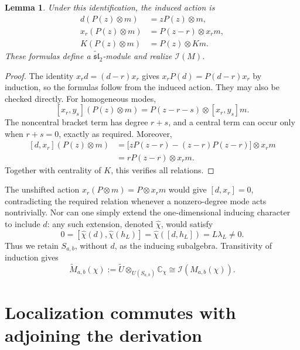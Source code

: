 \documentclass[11pt]{article}
\newcommand{\C}{\mathbb C}
\newcommand{\gt}{\widetilde{\mathfrak{sl}}_2}
\newcommand{\I}{\mathcal I}
\newtheorem{lemma}[theorem]{Lemma}
\theoremstyle{definition}
\begin{document}
\begin{lemma}\label{lem:shift-action}
Under this identification, the induced action is
\begin{equation}\label{eq:shift-action}
\begin{aligned}
 d(P(z)\otimes m)&=zP(z)\otimes m,\\
 x_r(P(z)\otimes m)&=P(z-r)\otimes x_rm,\\
 K(P(z)\otimes m)&=P(z)\otimes Km.
\end{aligned}
\end{equation}
These formulas define a \(\gt\)-module and realize \(\I(M)\).
\end{lemma}
\begin{proof}
The identity \(x_rd=(d-r)x_r\) gives
\(x_rP(d)=P(d-r)x_r\) by induction, so the formulas follow from the
induced action. They may also be checked directly. For homogeneous
modes,
\[
 [x_r,y_s](P(z)\otimes m)=P(z-r-s)\otimes[x_r,y_s]m.
\]
The noncentral bracket term has degree \(r+s\), and a central term
can occur only when \(r+s=0\), exactly as required. Moreover,
\[
\begin{aligned}
 [d,x_r](P(z)\otimes m)
 &=\bigl[zP(z-r)-(z-r)P(z-r)\bigr]\otimes x_rm\\
 &=rP(z-r)\otimes x_rm.
\end{aligned}
\]
Together with centrality of \(K\), this verifies all relations.
\end{proof}

The unshifted action \(x_r(P\otimes m)=P\otimes x_rm\) would give
\([d,x_r]=0\), contradicting the required relation whenever a
nonzero-degree mode acts nontrivially. Nor can one simply extend the
one-dimensional inducing character to include \(d\): any such
extension, denoted \(\widehat\chi\), would satisfy
\[
 0=[\widehat\chi(d),\widehat\chi(h_L)]
   =\widehat\chi([d,h_L])=L\lambda_L\ne0.
\]
Thus we retain \(S_{a,b}\), without \(d\), as the inducing subalgebra.
Transitivity of induction gives
\begin{equation}\label{eq:induction-transitivity}
 \widetilde M_{a,b}(\chi)
 :=\widetilde U\otimes_{U(S_{a,b})}\C_\chi
 \cong\I(M_{a,b}(\chi)).
\end{equation}

\section{Localization commutes with adjoining the derivation}
\end{document}
